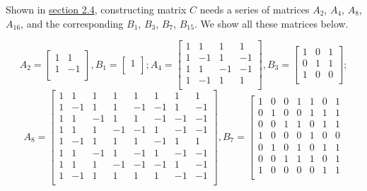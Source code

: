 \documentclass[11pt]{article}
\begin{document}
\begin{appendices}
Shown in \hyperref[section2.4]{section 2.4}, constructing matrix $C$ needs a series of matrices $A_2$, $A_4$, $A_8$, $A_{16}$, and the corresponding $B_1$, $B_3$, $B_7$, $B_{15}$. We show all these matrices below.

$$
A_2=
\left[\begin{smallmatrix}
1 & 1 \\
1 & -1 \\
\end{smallmatrix}\right],
B_1=
\left[\begin{smallmatrix}
1 \\
\end{smallmatrix}\right];
A_4=
\left[\begin{smallmatrix}
1 & 1 & 1 & 1 \\
1 & -1 & 1 & -1 \\
1 & 1 & -1 & -1 \\
1 & -1 & 1 & 1 \\
\end{smallmatrix}\right],
B_3=
\left[\begin{smallmatrix}
1 & 0 & 1 \\
0 & 1 & 1 \\
1 & 0 & 0 \\
\end{smallmatrix}\right];
$$
$$
A_8=
\left[\begin{smallmatrix}
1 & 1 & 1 & 1 & 1 & 1 & 1 & 1 \\
1 & -1 & 1 & 1 & -1 & -1 & 1 & -1 \\
1 & 1 & -1 & 1 & 1 & -1 & -1 & -1 \\
1 & 1 & 1 & -1 & -1 & 1 & -1 & -1 \\
1 & -1 & 1 & 1 & 1 & -1 & 1 & 1 \\
1 & 1 & -1 & 1 & -1 & 1 & -1 & -1 \\
1 & 1 & 1 & -1 & -1 & -1 & 1 & -1 \\
1 & -1 & 1 & 1 & 1 & 1 & -1 & -1 \\
\end{smallmatrix}\right],
B_7=
\left[\begin{smallmatrix}
1 & 0 & 0 & 1 & 1 & 0 & 1 \\
0 & 1 & 0 & 0 & 1 & 1 & 1 \\
0 & 0 & 1 & 1 & 0 & 1 & 1 \\
1 & 0 & 0 & 0 & 1 & 0 & 0 \\
0 & 1 & 0 & 1 & 0 & 1 & 1 \\
0 & 0 & 1 & 1 & 1 & 0 & 1 \\
1 & 0 & 0 & 0 & 0 & 1 & 1 \\

\end{smallmatrix}$$
\end{appendices}
\end{document}

